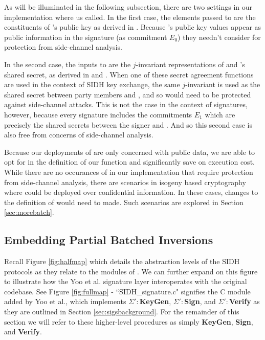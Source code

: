 As will be illuminated in the following subsection, there are two settings in our implementation where  us called. In the first case, the elements passed to  are the constituents of \randall's public key as derived in . Because \randall's public key values appear as public information in the signature (as commitment $E_0$) they needn't consider for protection from side-channel analysis. 

In the second case, the inputs to  are the $j$-invariant representations of \bob and \randall's shared secret, as derived in  and .  When one of these secret agreement functions are used in the context of SIDH key exchange, the same $j$-invariant is used as the shared secret between party members \ba and \rb, and so would need to be protected against side-channel attacks. This is not the case in the context of signatures, however, because every signature includes the commitments $E_1$ which are precisely the shared secrets between the signer and \randall. And so this second case is also free from concerns of side-channel analysis.

Because our deployments of \pbinv are only concerned with public data, we are able to opt for  in the definition of our function and significantly save on execution cost. While there are no occurances of \pbinv in our implementation that require protection from side-channel analysis, there are scenarios in isogeny based cryptography where  could be deployed over confidential information. In these cases, changes to the definition of \pbinv would need to made. Such scenarios are explored in Section \ref{sec:morebatch}. 

\subsection{Embedding Partial Batched Inversions}

Recall Figure \ref{fig:halfmap} which details the abstraction levels of the SIDH protocols as they relate to the modules of \sidh. We can further expand on this figure to illustrate how the Yoo et al. signature layer interoperates with the original \sidh codebase. See Figure \ref{fig:fullmap} - ``SIDH\_signature.c" signifies the C module added by Yoo et al., which implements $\Sigma':$\textbf{KeyGen}, $\Sigma':$\textbf{Sign}, and $\Sigma':$\textbf{Verify} as they are outlined in Section \ref{sec:sigsbackground}. For the remainder of this section we will refer to these higher-level procedures as simply \textbf{KeyGen}, \textbf{Sign}, and \textbf{Verify}.

